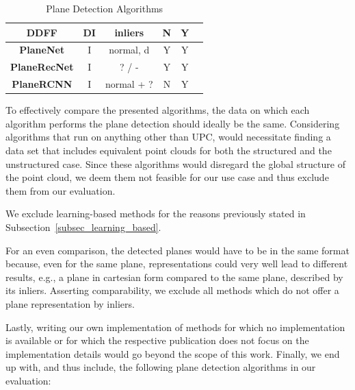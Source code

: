 \documentclass[main.tex]{subfiles}
\begin{document}
\begin{table}[H]
\begin{tabular}{|c|c|c|c|c|c}
        \textbf{DDFF} \cite{Roychoudhury_Missura_Bennewitz_2021}         & DI                  & inliers               & N                       & Y                     \\ \hline
        \textbf{PlaneNet} \cite{Liu_Yang_Ceylan_Yumer_Furukawa_2018}     & I                   & normal, d             & Y                       & Y                     \\ \hline
        \textbf{PlaneRecNet} \cite{Xie_Shu_Rambach_Pagani_Stricker_2022} & I                   & ? / -                 & Y                       & Y                     \\ \hline
        \textbf{PlaneRCNN} \cite{Liu_Kim_Gu_Furukawa_Kautz_2019}         & I                   & normal + ?            & N                       & Y                     \\ \hline
    \end{tabular}
    \caption{Plane Detection Algorithms}
    \label{tab:algos}
\end{table}

To effectively compare the presented algorithms, the data on which each algorithm performs the plane detection should ideally be the same.
Considering algorithms that run on anything other than UPC, would necessitate finding a data set that includes equivalent point clouds for both the structured and the unstructured case.
Since these algorithms would disregard the global structure of the point cloud, we deem them not feasible for our use case and thus exclude them from our evaluation.

We exclude learning-based methods for the reasons previously stated in Subsection~\ref{subsec_learning_based}.

For an even comparison, the detected planes would have to be in the same format because, even for the same plane, representations could very well lead to different results, e.g., a plane in cartesian form compared to the same plane, described by its inliers.
Asserting comparability, we exclude all methods which do not offer a plane representation by inliers.

Lastly, writing our own implementation of methods for which no implementation is available or for which the respective publication does not focus on the implementation details would go beyond the scope of this work.
Finally, we end up with, and thus include, the following plane detection algorithms in our evaluation:
\end{document}
